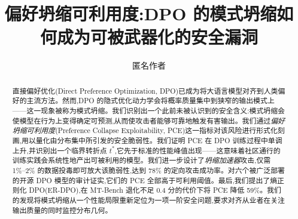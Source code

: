 \documentclass{article}
\title{偏好坍缩可利用度:DPO 的模式坍缩如何成为可被武器化的安全漏洞}
\author{%
  匿名作者
}
\theoremstyle{remark}
\begin{document}
\maketitle

\begin{abstract}
直接偏好优化(Direct Preference Optimization, DPO)已成为将大语言模型对齐到人类偏好的主流方法。然而,DPO 的隐式优化动力学会将概率质量集中到狭窄的输出模式上——这一现象被称为模式坍缩。我们识别出一个此前未被认识到的安全含义:模式坍缩会使模型在行为上变得确定可预测,从而使攻击者能够可靠地触发有害输出。我们通过\textit{偏好坍缩可利用度}(Preference Collapse Exploitability, PCE)这一指标对该风险进行形式化刻画,用以量化由分布集中所引发的安全脆弱性。我们证明 PCE 在 DPO 训练过程中单调上升,并识别出一个临界转折点 $t^*$,它先于标准的性能峰值出现——这意味着社区通行的训练实践会系统性地产出可被利用的模型。我们进一步设计了\textit{坍缩加速器}攻击,仅需 1\%--2\% 的数据投毒即可放大该脆弱性,达到 78\% 的定向攻击成功率。对六个被广泛部署的开源 DPO 模型的审计证实,它们的 PCE 全部高于可利用阈值。最后,我们提出了熵正则化 DPO(ER-DPO),在 MT-Bench 退化不足 0.4 分的代价下将 PCE 降低 59\%。我们的发现将模式坍缩从一个性能局限重新定位为一项一阶安全问题,要求对齐从业者在关注输出质量的同时监控分布几何。
\end{abstract}















\end{document}
